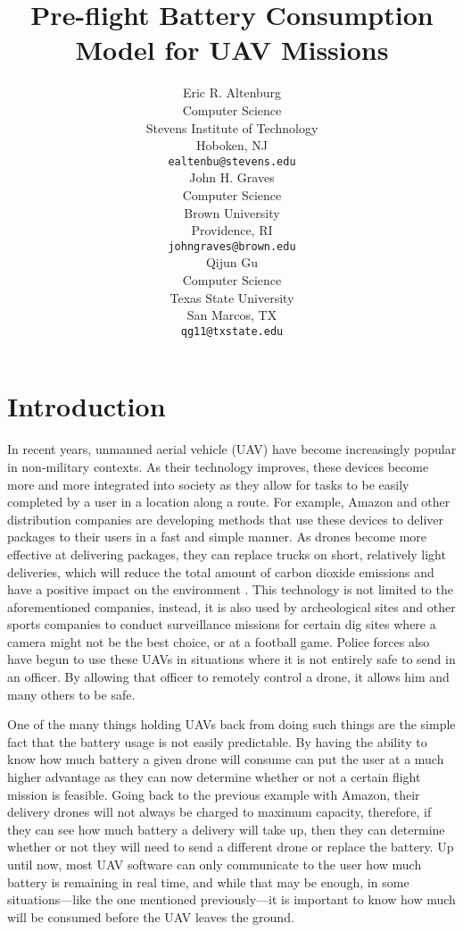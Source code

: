 \documentclass{article}
\title{Pre-flight Battery Consumption Model for UAV Missions}
\author{
  Eric R. Altenburg\\
  Computer Science\\
  Stevens Institute of Technology\\
  Hoboken, NJ \\
  \texttt{ealtenbu@stevens.edu}\\
   \And
  John H. Graves\\
  Computer Science\\
  Brown University\\
  Providence, RI \\
  \texttt{john\textunderscore graves@brown.edu} \\
  \And
  Qijun Gu\\
  Computer Science\\
  Texas State University\\
  San Marcos, TX \\
  \texttt{qg11@txstate.edu}\\
}
\begin{document}
\maketitle


\begin{abstract}
\lipsum[1]
\end{abstract}




\section{Introduction}
In recent years, unmanned aerial vehicle (UAV) have become increasingly popular in non-military contexts. As their technology improves, these devices become more and more integrated into society as they allow for tasks to be easily completed by a user in a location along a route. For example, Amazon and other distribution companies are developing methods that use these devices to deliver packages to their users in a fast and simple manner. As drones become more effective at delivering packages, they can replace trucks on short, relatively light deliveries, which will reduce the total amount of carbon dioxide emissions and have a positive impact on the environment \cite{Goodchild}. This technology is not limited to the aforementioned companies, instead, it is also used by archeological sites and other sports companies to conduct surveillance missions for certain dig sites where a camera might not be the best choice, or at a football game. Police forces also have begun to use these UAVs in situations where it is not entirely safe to send in an officer. By allowing that officer to remotely control a drone, it allows him and many others to be safe.\par

One of the many things holding UAVs back from doing such things are the simple fact that the battery usage is not easily predictable. By having the ability to know how much battery a given drone will consume can put the user at a much higher advantage as they can now determine whether or not a certain flight mission is feasible. Going back to the previous example with Amazon, their delivery drones will not always be charged to maximum capacity, therefore, if they can see how much battery a delivery will take up, then they can determine whether or not they will need to send a different drone or replace the battery. Up until now, most UAV software can only communicate to the user how much battery is remaining in real time, and while that may be enough, in some situations—like the one mentioned previously—it is important to know how much will be consumed before the UAV leaves the ground.\par
\end{document}
